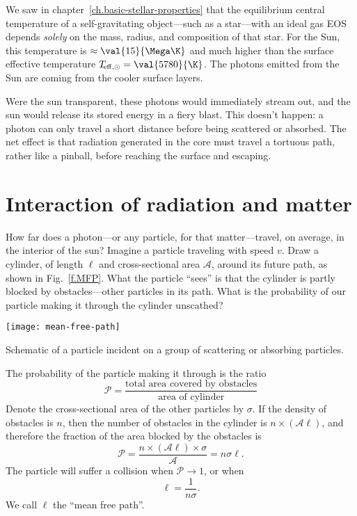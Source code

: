 
We saw in chapter~\ref{ch.basic-stellar-properties} that the equilibrium central temperature of a self-gravitating object---such as a star---with an ideal gas EOS depends \emph{solely} on the mass, radius, and composition of that star. For the Sun, this temperature is $\approx \val{15}{\Mega\K}$ and much higher than the surface effective temperature $T_{\!\mathrm{eff,\odot}} = \val{5780}{\K}$. The photons emitted from the Sun are coming from the cooler surface layers.

  Were the sun transparent, these photons would immediately stream out, and the sun would release its stored energy in a fiery blast.  This doesn't happen: a photon can only travel a short distance before being scattered or absorbed. The net effect is that radiation generated in the core must travel a tortuous path, rather like a pinball, before reaching the surface and escaping.

\section{Interaction of radiation and matter}\label{s.interaction-radiation-matter}

How far does a photon---or any particle, for that matter---travel, on average, in the interior of the sun? Imagine a particle traveling with speed $v$.  Draw a cylinder, of length $\ell$ and cross-sectional area $\mathcal{A}$, around its future path, as shown in Fig.~\ref{f.MFP}. What the particle ``sees'' is that the cylinder is partly blocked by obstacles---other particles in its path. What is the probability of our particle making it through the cylinder unscathed?

\begin{marginfigure}
    \texttt{[image: mean-free-path]}
    \caption{\label{f.MFP} Schematic of a particle incident on a group of scattering or absorbing particles.}
\end{marginfigure}

The probability of the particle making it through is the ratio
\[
    \mathcal{P} = \frac{\textrm{total area covered by obstacles}}{\textrm{area of cylinder}}
\]
Denote the cross-sectional area of the other particles by $\sigma$.  If the density of obstacles is $n$, then the number of obstacles in the cylinder is $n\times(\mathcal{A}\ell)$, and therefore the fraction of the area blocked by the obstacles is
\begin{equation}
    \mathcal{P} = \frac{n\times(\mathcal{A}\ell)\times\sigma}{\mathcal{A}} = n\sigma\ell.
\label{e.prob-MFP}
\end{equation}
The particle will suffer a collision when $\mathcal{P}\to 1$, or when
\begin{equation}\label{e.MFP}
    \ell = \frac{1}{n\sigma}.
\end{equation}
We call $\ell$ the ``mean free path''.

